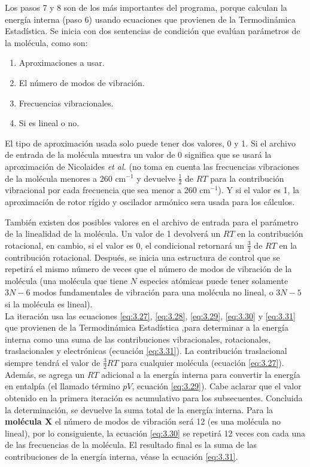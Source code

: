 Los pasos 7 y 8 son de los más importantes del programa, porque calculan la energía interna (paso 6) usando ecuaciones que provienen de la Termodinámica Estadística. Se inicia con dos sentencias de condición que evalúan parámetros de la molécula, como son:

\begin{multicols}{2}
\begin{enumerate}
	\item Aproximaciones a usar.
	\item El número de modos de vibración.
	\item Frecuencias vibracionales.
	\item Si es lineal o no.
\end{enumerate}
\end{multicols}

El tipo de aproximación usada solo puede tener dos valores, 0 y 1. Si el archivo de entrada de la molécula muestra un valor de 0 significa que se usará la aproximación de Nicolaides \textit{et al.} \cite{Nicolaides1996} (no toma en cuenta las frecuencias vibraciones de la molécula menores a 260 cm$^{-1}$ y devuelve $\frac{1}{2}$ de $RT$ para la contribución vibracional por cada frecuencia que sea menor a 260 cm$^{-1}$). Y si el valor es 1, la aproximación de rotor rígido y oscilador armónico \cite{McQuarrie1976} sera usada para los cálculos. 

También existen dos posibles valores en el archivo de entrada para el parámetro de la linealidad de la molécula. Un valor de 1 devolverá un $RT$ en la contribución rotacional, en cambio, si el valor es 0, el condicional retornará un $\frac{3}{2}$ de $RT$ en la contribución rotacional. Después, se inicia una estructura de control que se repetirá el mismo número de veces que el número de modos de vibración de la molécula (una molécula que tiene $N$ especies atómicas puede tener solamente $3N-6$ modos fundamentales de vibración para una molécula no lineal, o $3N-5$ si la molécula es lineal). \\

La iteración usa las ecuaciones \ref{eq:3.27}, \ref{eq:3.28}, \ref{eq:3.29}, \ref{eq:3.30} y \ref{eq:3.31} que provienen de la Termodinámica Estadística \cite{McQuarrie1976, Irikura1998} ,para determinar a la energía interna como una suma de las contribuciones vibracionales, rotacionales, traslacionales y electrónicas (ecuación \ref{eq:3.31}). La contribuci\'{o}n traslacional siempre tendr\'{a} el valor de $\frac{3}{2} RT$ para cualquier mol\'{e}cula (ecuación \ref{eq:3.27}). Adem\'{a}s, se agrega un $RT$ adicional a la energ\'{i}a interna para convertir la energía en entalpía (el llamado término $pV$, ecuación \ref{eq:3.29}). Cabe aclarar que el valor obtenido en la primera iteración es acumulativo para los subsecuentes. Concluida la determinación, se devuelve la suma total de la energía interna. Para la \textbf{molécula X} el número de modos de vibración será 12 (es una molécula no lineal), por lo consiguiente, la ecuación \ref{eq:3.30} se repetirá 12 veces con cada una de las frecuencias de la molécula. El resultado final es la suma de las contribuciones de la energía interna, véase la ecuación \ref{eq:3.31}.

